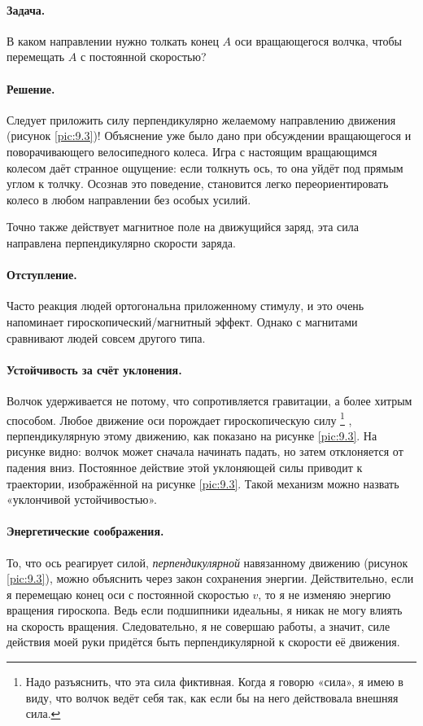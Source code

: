 \paragraph{Задача.}\label{Антигравитационное велоколесо:Задача}
В каком направлении нужно толкать конец $A$ оси вращающегося волчка, чтобы перемещать $A$ с постоянной скоростью?

\paragraph{Решение.}
Следует приложить силу перпендикулярно желаемому направлению движения (рисунок \ref{pic:9.3})!
Объяснение уже было дано при обсуждении вращающегося и поворачивающего велосипедного колеса.
Игра с настоящим вращающимся колесом даёт странное ощущение: если толкнуть ось, то она уйдёт под прямым углом к толчку.
Осознав это поведение, становится легко переориентировать колесо в любом направлении без особых усилий.

Точно также действует магнитное поле на движущийся заряд, эта сила направлена перпендикулярно скорости заряда.

\paragraph{Отступление.} Часто реакция людей ортогональна приложенному стимулу,
и это очень напоминает гироскопический/магнитный эффект.
Однако с магнитами сравнивают людей совсем другого типа.

\paragraph{Устойчивость за счёт уклонения.}
Волчок удерживается не потому, что сопротивляется гравитации, а более хитрым способом.
Любое движение оси порождает гироскопическую силу%
\footnote{Надо разъяснить, что эта сила фиктивная.
Когда я говорю «сила», я имею в виду, что волчок ведёт себя так, как если бы на него действовала внешняя сила.}%
, перпендикулярную этому движению, как показано на рисунке \ref{pic:9.3}.
На рисунке видно: волчок может сначала начинать падать, но затем отклоняется от падения вниз.
Постоянное действие этой уклоняющей силы приводит к траектории, изображённой на рисунке \ref{pic:9.3}.
Такой механизм можно назвать «уклончивой устойчивостью».

\paragraph{Энергетические соображения.}
То, что ось реагирует силой, \emph{перпендикулярной} навязанному движению (рисунок \ref{pic:9.3}), можно объяснить через закон сохранения энергии.
Действительно, если я перемещаю конец оси с постоянной скоростью $v$, то я не изменяю энергию вращения гироскопа.
Ведь если подшипники идеальны, я никак не могу влиять на скорость вращения.
Следовательно, я не совершаю работы, а значит, силе действия моей руки придётся быть перпендикулярной к скорости её движения.

